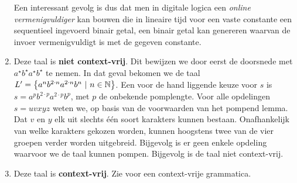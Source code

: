 \documentclass{article}
\begin{document}
\begin{question}
\begin{answer}
\begin{enumerate}
 Een interessant gevolg is dus dat men in digitale logica een \emph{online vermenigvuldiger} kan bouwen die in lineaire tijd voor een vaste constante een sequentieel ingevoerd binair getal, een binair getal kan genereren waarvan de invoer vermenigvuldigt is met de gegeven constante.
 \item Deze taal is \textbf{niet context-vrij}. Dit bewijzen we door eerst de doorsnede met $a^{\star}b^{\star}a^{\star}b^{\star}$ te nemen. In dat geval bekomen we de taal $L'=\left\{ a^nb^{2\cdot n}a^{2\cdot n}b^n\ |\ n\in\mathbb{N} \right\}$. Een voor de hand liggende keuze voor $s$ is $s=a^pb^{2\cdot p}a^{2\cdot p}b^p$, met $p$ de onbekende pomplengte. Voor alle opdelingen $s=uvxyz$ weten we, op basis van de voorwaarden van het pompend lemma. Dat $v$ en $y$ elk uit slechts \'e\'en soort karakters kunnen bestaan. Onafhankelijk van welke karakters gekozen worden, kunnen hoogstens twee van de vier groepen verder worden uitgebreid. Bijgevolg is er geen enkele opdeling waarvoor we de taal kunnen pompen. Bijgevolg is de taal niet context-vrij.
 \item Deze taal is \textbf{context-vrij}. Zie  voor een context-vrije grammatica.
\end{enumerate}
\end{answer}
\end{question}
\end{document}
